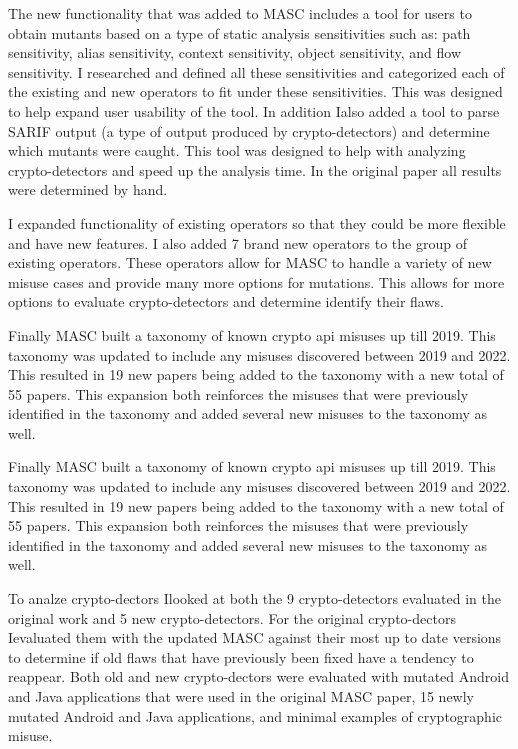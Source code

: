 \begin{large}
\begin{flushleft}
The new functionality that was added to MASC includes a tool for users to obtain mutants based on a type of static analysis sensitivities such as: path sensitivity, alias sensitivity, context sensitivity, object sensitivity, and flow sensitivity. I researched and defined all these sensitivities and categorized each of the existing and new operators to fit under these sensitivities. This was designed to help expand user usability of the tool. In addition Ialso added a tool to parse SARIF output (a type of output produced by crypto-detectors) and determine which mutants were caught. This tool was designed to help with analyzing crypto-detectors and speed up the analysis time. In the original paper all results were determined by hand.
\end{flushleft}
\begin{flushleft}
I expanded functionality of existing operators so that they could be more flexible and have new features. I also added 7 brand new operators to the group of existing operators. These operators allow for MASC to handle a variety of new misuse cases and provide many more options for mutations. This allows for more options to evaluate crypto-detectors and determine identify their flaws.
\end{flushleft}
\begin{flushleft}
Finally MASC built a taxonomy of known crypto api misuses up till 2019. This taxonomy was updated to include any misuses discovered between 2019 and 2022. This resulted in 19 new papers being added to the taxonomy with a new total of 55 papers. This expansion both reinforces the misuses that were previously identified in the taxonomy and added several new misuses to the taxonomy as well.
\end{flushleft}
\begin{flushleft}
Finally MASC built a taxonomy of known crypto api misuses up till 2019. This taxonomy was updated to include any misuses discovered between 2019 and 2022. This resulted in 19 new papers being added to the taxonomy with a new total of 55 papers. This expansion both reinforces the misuses that were previously identified in the taxonomy and added several new misuses to the taxonomy as well.
\end{flushleft}
\begin{flushleft}
To analze crypto-dectors Ilooked at both the 9 crypto-detectors evaluated in the original work and 5 new crypto-detectors. For the original crypto-dectors Ievaluated them with the updated MASC against their most up to date versions to determine if old flaws that have previously been fixed have a tendency to reappear. Both old and new crypto-dectors were evaluated with mutated Android and Java applications that were used in the original MASC paper, 15 newly mutated Android and Java applications, and minimal examples of cryptographic misuse.
\end{flushleft}

\end{large}